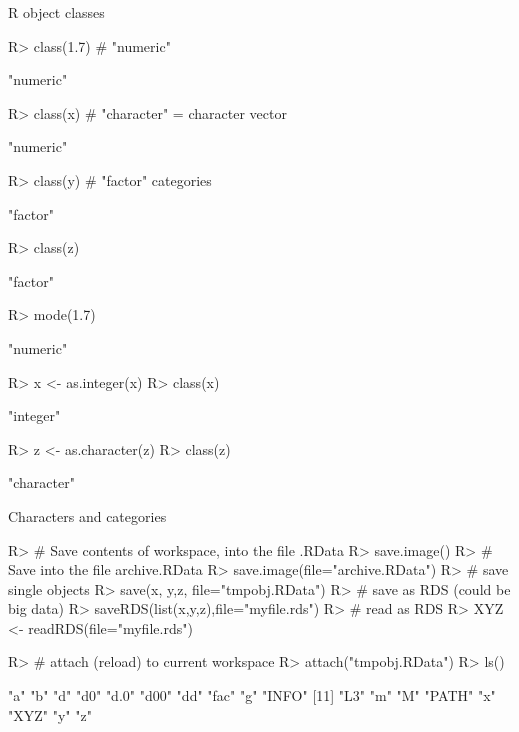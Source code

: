 \documentclass[10pt]{beamer}
\let\proglang=\textsf
\begin{document}
\begin{frame}[fragile]{\proglang{R} object classes}
\begin{Schunk}
\begin{Sinput}
R> 		class(1.7) # "numeric"
\end{Sinput}
\begin{Soutput}
[1] "numeric"
\end{Soutput}
\begin{Sinput}
R> class(x)   # "character" = character vector
\end{Sinput}
\begin{Soutput}
[1] "numeric"
\end{Soutput}
\begin{Sinput}
R> class(y)   # "factor" categories
\end{Sinput}
\begin{Soutput}
[1] "factor"
\end{Soutput}
\begin{Sinput}
R> class(z)
\end{Sinput}
\begin{Soutput}
[1] "factor"
\end{Soutput}
\begin{Sinput}
R> mode(1.7)
\end{Sinput}
\begin{Soutput}
[1] "numeric"
\end{Soutput}
\begin{Sinput}
R> x <- as.integer(x)
R> class(x)
\end{Sinput}
\begin{Soutput}
[1] "integer"
\end{Soutput}
\begin{Sinput}
R> z <- as.character(z)
R> class(z)
\end{Sinput}
\begin{Soutput}
[1] "character"
\end{Soutput}
\end{Schunk}
\end{frame}
%
\begin{frame}[fragile]{Characters and categories}
\begin{Schunk}
\begin{Sinput}
R> # Save contents of workspace, into the file .RData
R> 		save.image()
R> # Save into the file archive.RData
R> save.image(file="archive.RData")
R> # save single objects
R> save(x, y,z, file="tmpobj.RData")
R> # save as RDS (could be big data)
R> saveRDS(list(x,y,z),file="myfile.rds")
R> # read as RDS
R> XYZ <- readRDS(file="myfile.rds")
\end{Sinput}
\end{Schunk}
\begin{Schunk}
\begin{Sinput}
R> # attach (reload) to current workspace
R> 		attach("tmpobj.RData")
R> ls()
\end{Sinput}
\begin{Soutput}
 [1] "a"    "b"    "d"    "d0"   "d.0"  "d00"  "dd"   "fac"  "g"    "INFO"
[11] "L3"   "m"    "M"    "PATH" "x"    "XYZ"  "y"    "z"   
\end{Soutput}
\end{Schunk}
\end{frame}
\end{document}

